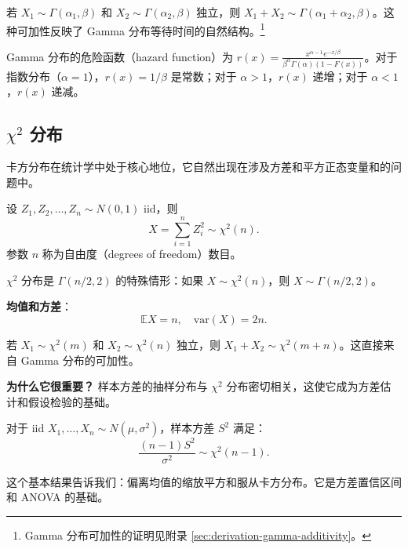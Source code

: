 \begin{example}\label{rmk:gamma-additivity-ch3}
若 $X_1 \sim \Gamma(\alpha_1, \beta)$ 和 $X_2 \sim \Gamma(\alpha_2, \beta)$ 独立，则 $X_1 + X_2 \sim \Gamma(\alpha_1 + \alpha_2, \beta)$。这种可加性反映了 Gamma 分布等待时间的自然结构。\footnote{Gamma 分布可加性的证明见附录 \cref{sec:derivation-gamma-additivity}。}
\end{example}

\begin{example}\label{rmk:hazard-function-ch3}
Gamma 分布的危险函数（hazard function）为 $r(x) = \frac{x^{\alpha-1} e^{-x/\beta}}{\beta^{\alpha} \Gamma(\alpha) (1 - F(x))}$。对于指数分布（$\alpha=1$），$r(x) = 1/\beta$ 是常数；对于 $\alpha > 1$，$r(x)$ 递增；对于 $\alpha < 1$，$r(x)$ 递减。
\end{example}

\subsection{$\chi^{2}$ 分布}\label{sub:chi-square-ch3}

卡方分布在统计学中处于核心地位，它自然出现在涉及方差和平方正态变量和的问题中。

\begin{definition}[卡方分布]\label{def:chi-square-ch3}
设 $Z_1, Z_2, \ldots, Z_n \sim N(0, 1)$ iid，则
\[
X = \sum_{i=1}^{n} Z_i^{2} \sim \chi^{2}(n).
\label{eq:chi-square-definition-ch3}
\]
参数 $n$ 称为自由度（degrees of freedom）数目。
\end{definition}

$\chi^{2}$ 分布是 $\Gamma(n/2, 2)$ 的特殊情形：如果 $X \sim \chi^{2}(n)$，则 $X \sim \Gamma(n/2, 2)$。

\textbf{均值和方差}：
\[
\mathbb{E}X = n, \quad \text{var}(X) = 2n.
\label{eq:chi-square-moments-ch3}
\]

\begin{example}\label{rmk:chi-square-additivity-ch3}
若 $X_1 \sim \chi^{2}(m)$ 和 $X_2 \sim \chi^{2}(n)$ 独立，则 $X_1 + X_2 \sim \chi^{2}(m+n)$。这直接来自 Gamma 分布的可加性。
\end{example}

\textbf{为什么它很重要？} 样本方差的抽样分布与 $\chi^{2}$ 分布密切相关，这使它成为方差估计和假设检验的基础。

\begin{example}[样本方差分布]\label{ex:sample-variance-ch3}
对于 iid $X_1, \ldots, X_n \sim N(\mu, \sigma^{2})$，样本方差 $S^{2}$ 满足：
\[
\frac{(n-1)S^{2}}{\sigma^{2}} \sim \chi^{2}(n-1).
\label{eq:sample-variance-chi-square-ch3}
\]

这个基本结果告诉我们：偏离均值的缩放平方和服从卡方分布。它是方差置信区间和 ANOVA 的基础。
\end{example}

